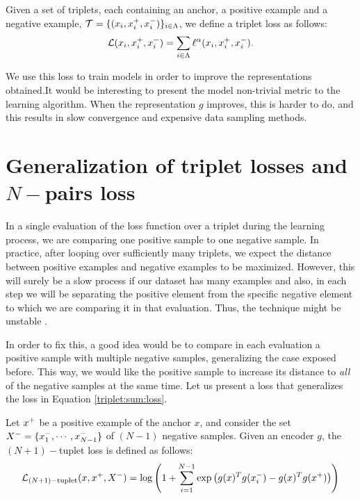 \begin{ndef}
Given a set of triplets, each containing an anchor, a positive example and a negative example, $\mathcal T = \{(x_i,x^+_i,x^-_i)\}_{i \in \Lambda}$, we define a triplet loss as follows:
\begin{equation}\label{triplet:sum:loss}
\mathcal L (x_i,x^+_i,x^-_i) = \sum_{i \in \Lambda} \ell^\alpha(x_i,x^+_i,x^-_i).
\end{equation}

\end{ndef}



We use this loss to train models in order to improve the representations obtained.It would be interesting to present the model non-trivial metric to the learning algorithm. When the representation $g$ improves, this is harder to do, and this results in slow convergence and expensive data sampling methods.

\section{Generalization of triplet losses and $N-$pairs loss}

In a single evaluation of the loss function over a triplet during the learning process, we are comparing one positive sample to one negative sample. In practice, after looping over sufficiently many triplets, we expect the distance between positive examples and negative examples to be maximized. However, this will surely be a slow process if our dataset has many examples and also, in each step we will be separating the positive element from the specific negative element to which we are comparing it in that evaluation. Thus, the technique might be unstable \citep{Sohn2016ImprovedDM}.

In order to fix this, a good idea would be to compare in each evaluation a positive sample with multiple negative samples, generalizing the case exposed before. This way, we would like the positive sample to increase its distance to \emph{all} of the negative samples at the same time. Let us present a loss that generalizes the loss in Equation \eqref{triplet:sum:loss}.

\begin{ndef}
Let $x^+$ be a positive example of the anchor $x$, and consider the set $X^- = \{x^-_1,\cdots,x^-_{N-1}\}$ of $(N-1)$ negative samples. Given an encoder $g$, the $(N+1)-$tuplet loss is defined as follows:
\begin{equation}\label{nplus1:tuplet:loss}
\mathcal L_{(N+1)-\text{tuplet}}(x,x^+,X^-) = \log \left( 1+ \sum_{i=1}^{N-1} \exp \left(g(x)^T g(x^-_i) - g(x)^T g(x^+)\right)\right) 
\end{equation}
\end{ndef}

